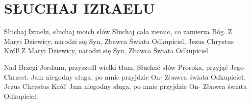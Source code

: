 \documentclass[../../../songbook.tex]{subfiles}
\begin{document}
\TabPositions{8cm} %
\section*{SŁUCHAJ IZRAELU}
\vspace{0.5cm}
Słuchaj Izraelu, słuchaj moich słów				 \newline
Słuchaj cała ziemio, co zamierza Bóg.			 \newline
Z Maryi Dziewicy, narodzi się Syn,				 \newline
Zbawca Świata Odkupiciel, Jezus Chrystus Król!	 \newline
\-\hspace{1cm}Z Maryi Dziewicy, narodzi się Syn,	 \newline
\-\hspace{1cm}Zbawca Świata Odkupiciel.				 \newline

Nad Brzegi Jordanu, przyszedł wielki tłum,		\newline
Słuchać słów Proroka, przyjąć Jego Chrzest.		\newline
Jam niegodny sługa, po mnie przyjdzie On-		\newline
Zbawca świata Odkupiciel, Jezus Chrystus Król!	\newline
\-\hspace{1cm}Jam niegodny sługa, po mnie przyjdzie On-	\newline
\-\hspace{1cm}Zbawca świata Odkupiciel.		\newline
\end{document}
